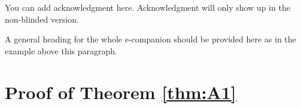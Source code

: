\documentclass[poms,final,nonblindrev]{poms1_V1} %
\begin{document}
You can add acknowledgment here. Acknowledgment will only show up in the non-blinded version.







 \let\oldbibliography\thebibliography
 \renewcommand{\thebibliography}[1]{%
    \oldbibliography{#1}%
    \baselineskip14pt %
    \setlength{\itemsep}{10pt}%
 }









\ECSwitch %


\noindent A general heading for the whole e-companion should be provided here as in the example above this paragraph.

\section{Proof of Theorem \ref{thm:A1}}
\end{document}
